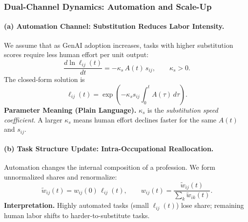 \subsubsection{Dual-Channel Dynamics: Automation and Scale-Up}
\label{sec:two_channel}

\paragraph{(a) Automation Channel: Substitution Reduces Labor Intensity.}
We assume that as GenAI adoption increases, tasks with higher substitution scores require less human effort per unit output:
\begin{equation}
\label{eq:labor_intensity_ode}
\frac{d \ln \ell_{ij}(t)}{dt} = -\kappa_s\,A(t)\,s_{ij}, \qquad \kappa_s>0.
\end{equation}
The closed-form solution is
\begin{equation}
\label{eq:labor_intensity_closed}
\ell_{ij}(t) = \exp\!\left(-\kappa_s s_{ij}\int_0^t A(\tau)\,d\tau\right).
\end{equation}
\noindent\textbf{Parameter Meaning (Plain Language).} $\kappa_s$ is the \emph{substitution speed coefficient}. A larger $\kappa_s$ means human effort declines faster for the same $A(t)$ and $s_{ij}$.

\paragraph{(b) Task Structure Update: Intra-Occupational Reallocation.}
Automation changes the internal composition of a profession. We form unnormalized shares and renormalize:
\begin{equation}
\label{eq:share_update}
\tilde w_{ij}(t) = w_{ij}(0)\,\ell_{ij}(t), 
\qquad
w_{ij}(t)=\frac{\tilde w_{ij}(t)}{\sum_{k} \tilde w_{ik}(t)}.
\end{equation}
\noindent\textbf{Interpretation.} Highly automated tasks (small $\ell_{ij}(t)$) lose share; remaining human labor shifts to harder-to-substitute tasks.

